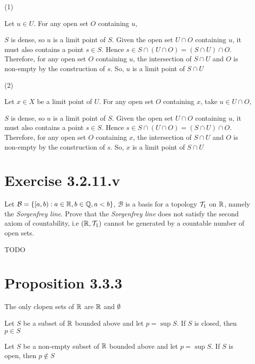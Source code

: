 \documentclass{article}
\begin{document}
(1)

Let $u \in U$. For any open set $O$ containing $u$,

$S$ is dense, so $u$ is a limit point of $S$. Given the open set $U \cap O$ containing $u$, it must also contains a point $s \in S$. Hence $s \in S \cap (U \cap O) = (S \cap U) \cap O$. Therefore, for any open set $O$ containing $u$, the intersection of $S \cap U$ and $O$ is non-empty by the construction of $s$. So, $u$ is a limit point of $S \cap U$

(2)

Let $x \in X$ be a limit point of $U$. For any open set $O$ containing $x$, take $u \in U \cap O$,

$S$ is dense, so $u$ is a limit point of $S$. Given the open set $U \cap O$ containing $u$, it must also contains a point $s \in S$. Hence $s \in S \cap (U \cap O) = (S \cap U) \cap O$. Therefore, for any open set $O$ containing $x$, the intersection of $S \cap U$ and $O$ is non-empty by the construction of $s$. So, $x$ is a limit point of $S \cap U$

\section*{Exercise 3.2.11.v}

Let $\mathcal{B} = \{ [a, b): a \in \mathbb{R}, b \in \mathbb{Q}, a < b\}$, $\mathcal{B}$ is a basis for a topology $\mathcal{T}_1$ on $\mathbb{R}$, namely the \emph{Sorgenfrey line}. Prove that the \emph{Sorgenfrey line} does not satisfy the second axiom of countability, i.e $(\mathbb{R}, \mathcal{T}_1)$ cannot be generated by a countable number of open sets.



TODO

\section*{Proposition 3.3.3}

The only clopen sets of $\mathbb{R}$ are $\mathbb{R}$ and $\emptyset$



\begin{lemma}[Lemma 3.3.2]
    \label{lemma_3.3.2}
    Let $S$ be a subset of $\mathbb{R}$ bounded above and let $p = \sup S$. If $S$ is closed, then $p \in S$ 
\end{lemma}

\begin{lemma}
    \label{lemma_3.3.3.1}
    Let $S$ be a non-empty subset of $\mathbb{R}$ bounded above and let $p = \sup S$. If $S$ is open, then $p \notin S$ 
\end{lemma}
\end{document}
